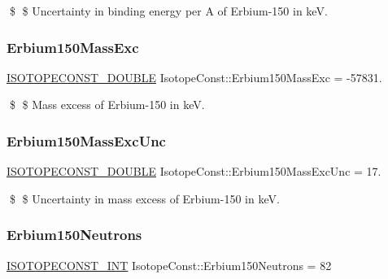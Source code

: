 \$ \$ Uncertainty in binding energy per A of Erbium-\/150 in keV. \mbox{\label{group___isotope_const-_erbium-_er150_ga8764e1886db340d69b68748b1c272f37}} 
\subsubsection{\texorpdfstring{Erbium150\+Mass\+Exc}{Erbium150MassExc}}
{\footnotesize\ttfamily \mbox{\hyperlink{group___isotope_const-_macros_ga8f45a7272ce02c0b4c65c44636ed719a}{I\+S\+O\+T\+O\+P\+E\+C\+O\+N\+S\+T\+\_\+\+D\+O\+U\+B\+LE}} Isotope\+Const\+::\+Erbium150\+Mass\+Exc = -\/57831.}

\$ \$ Mass excess of Erbium-\/150 in keV. \mbox{\label{group___isotope_const-_erbium-_er150_gad4f871fb875bccea2325b1343b995dbf}} 
\subsubsection{\texorpdfstring{Erbium150\+Mass\+Exc\+Unc}{Erbium150MassExcUnc}}
{\footnotesize\ttfamily \mbox{\hyperlink{group___isotope_const-_macros_ga8f45a7272ce02c0b4c65c44636ed719a}{I\+S\+O\+T\+O\+P\+E\+C\+O\+N\+S\+T\+\_\+\+D\+O\+U\+B\+LE}} Isotope\+Const\+::\+Erbium150\+Mass\+Exc\+Unc = 17.}

\$ \$ Uncertainty in mass excess of Erbium-\/150 in keV. \mbox{\label{group___isotope_const-_erbium-_er150_ga5f51f3e79dd3ad4ee8f0737c7a47428d}} 
\subsubsection{\texorpdfstring{Erbium150\+Neutrons}{Erbium150Neutrons}}
{\footnotesize\ttfamily \mbox{\hyperlink{group___isotope_const-_macros_ga5f18360b3e99483a35c32d789e62621c}{I\+S\+O\+T\+O\+P\+E\+C\+O\+N\+S\+T\+\_\+\+I\+NT}} Isotope\+Const\+::\+Erbium150\+Neutrons = 82}

